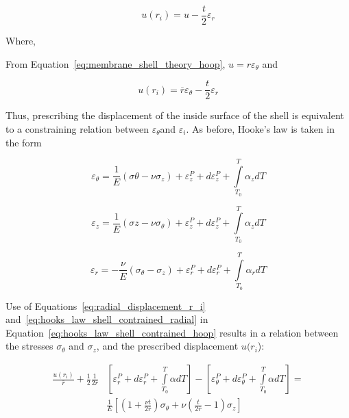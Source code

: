 \begin{equation}
    \label{eq:inside_surface_displacement_closed_gap}
    u\left(r_{i}\right) = u - \frac{t}{2} \varepsilon_{r}
\end{equation}

Where,

From Equation~\ref{eq:membrane_shell_theory_hoop}, $u = r\varepsilon_{\theta}$ and

\begin{equation}
    \label{eq:radial_displacement_r_i}
    u\left(r_{i}\right) = \overline{r}\varepsilon_{\theta} - \frac{t}{2} \varepsilon_{r}
\end{equation}

Thus, prescribing the displacement of the inside surface of the shell is equivalent to a
constraining relation between $\varepsilon_{\theta}$and $\varepsilon_{i}$. As before, Hooke's law is
taken in the form

\begin{equation}
    \label{eq:hooks_law_shell_contrained_hoop}
    \varepsilon_{\theta} = \frac{1}{E} \left( \sigma{\theta}-\nu\sigma_{z} \right)+\varepsilon_{z}^P+d\varepsilon_{z}^P+\int\limits_{T_0}^T \alpha_{z}dT
\end{equation}

\begin{equation}
    \label{eq:hooks_law_shell_contrained_axial}
    \varepsilon_{z} = \frac{1}{E} \left( \sigma{z}-\nu\sigma_{\theta} \right)+\varepsilon_{z}^P+d\varepsilon_{z}^P+\int\limits_{T_0}^T \alpha_{z}dT
\end{equation}

\begin{equation}
    \label{eq:hooks_law_shell_contrained_radial}
    \varepsilon_{r} = -\frac{\nu}{E} \left( \sigma_{\theta}-\sigma_{z} \right)+\varepsilon_{r}^P+d\varepsilon_{r}^P+\int\limits_{T_0}^T \alpha_{r}dT
\end{equation}

Use of Equations~\ref{eq:radial_displacement_r_i} and~\ref{eq:hooks_law_shell_contrained_radial} in
Equation~\ref{eq:hooks_law_shell_contrained_hoop} results in a relation between the stresses
$\sigma_{\theta}$ and $\sigma_{z}$, and the prescribed displacement $u(r_{i}$):

\begin{equation}
    \label{eq:relationship_hoop_axial_stress_and_displacement_ur}
    \begin{aligned}
        \frac{u(r_i)}{\bar{r}}+\frac{1}{2} \frac{1}{2 \bar{r}} & \left[ \varepsilon_{r}^P+d\varepsilon_{r}^P+\int\limits_{T_0}^T \alpha dT \right]-\left[ \varepsilon_{\theta}^P+d\varepsilon_{\theta}^P+\int\limits_{T_0}^T \alpha dT \right] = \\
        & \frac{1}{E} \left[ \left( 1+ \frac{\nu t}{2 \bar{r}} \right) \sigma_{\theta}+\nu \left( \frac{t}{2 \bar{r}}-1 \right) \sigma_{z} \right]
    \end{aligned}
\end{equation}

